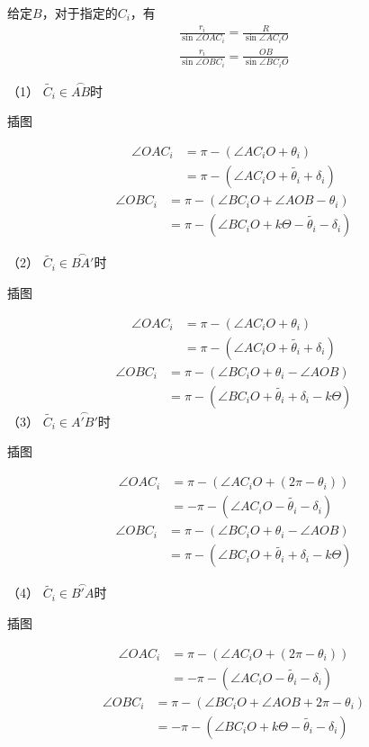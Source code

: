 \documentclass[UTF8]{ctexart}
\begin{document}
给定\(B\)，对于指定的\(C_i\)，有
\begin{align}
    \frac{r_i}{\sin{\angle OAC_i}} = \frac{R}{\sin\angle AC_iO} \\
    \frac{r_i}{\sin{\angle OBC_i}} = \frac{OB}{\sin\angle BC_iO}
\end{align}

（1） $ \tilde{C_i}\in\overset{\frown}{AB} $时

插图

\begin{align*}
    \angle OAC_i & =\pi - (\angle AC_iO + \theta_i)                  \\
                 & =\pi - (\angle AC_iO + \tilde{\theta_i}+\delta_i)
\end{align*}
\begin{align*}
    \angle OBC_i & =\pi - (\angle BC_iO + \angle AOB - \theta_i)                \\
                 & = \pi - (\angle BC_iO + k\Theta - \tilde{\theta_i}-\delta_i)
\end{align*}

（2） $ \tilde{C_i}\in\overset{\frown}{BA'} $时

插图

\begin{align*}
    \angle OAC_i & =\pi - (\angle AC_iO + \theta_i)                  \\
                 & =\pi - (\angle AC_iO + \tilde{\theta_i}+\delta_i)
\end{align*}
\begin{align*}
    \angle OBC_i & =\pi - (\angle BC_iO + \theta_i - \angle AOB )                \\
                 & = \pi - (\angle BC_iO + \tilde{\theta_i}+\delta_i - k\Theta )
\end{align*}
（3） $ \tilde{C_i}\in\overset{\frown}{A'B'} $时

插图

\begin{align*}
    \angle OAC_i & =\pi - (\angle AC_iO + (2\pi -\theta_i))           \\
                 & =-\pi - (\angle AC_iO - \tilde{\theta_i}-\delta_i)
\end{align*}
\begin{align*}
    \angle OBC_i & =\pi - (\angle BC_iO + \theta_i - \angle AOB )                \\
                 & = \pi - (\angle BC_iO + \tilde{\theta_i}+\delta_i - k\Theta )
\end{align*}

（4） $ \tilde{C_i}\in\overset{\frown}{B'A} $时

插图

\begin{align*}
    \angle OAC_i & =\pi - (\angle AC_iO + (2\pi-\theta_i ))           \\
                 & =-\pi - (\angle AC_iO - \tilde{\theta_i}-\delta_i)
\end{align*}
\begin{align*}
    \angle OBC_i & =\pi - (\angle BC_iO + \angle AOB +2\pi - \theta_i)           \\
                 & = -\pi - (\angle BC_iO + k\Theta - \tilde{\theta_i}-\delta_i)
\end{align*}
\end{document}
